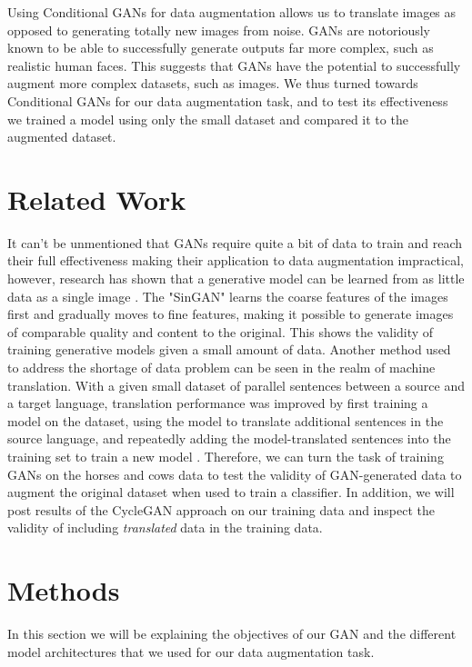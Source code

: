 \documentclass[conference]{IEEEtran}
\begin{document}
Using Conditional GANs for data augmentation allows us to translate images as opposed to generating totally new images from noise. GANs are notoriously known to be able to successfully generate outputs far more complex, such as realistic human faces. This suggests that GANs have the potential to successfully augment more complex datasets, such as images.
We thus turned towards Conditional GANs for our data augmentation task, and to test its effectiveness we trained a model using only the small dataset and compared it to the augmented dataset.

\section{Related Work}
It can't be unmentioned that GANs require quite a bit of data to train and reach their full effectiveness making their application to data augmentation impractical, however, research has shown that a generative model can be learned from as little data as a single image \cite{https://doi.org/10.48550/arxiv.1905.01164}. The "SinGAN" learns the coarse features of the images first and gradually moves to fine features, making it possible
to generate images of comparable quality and content to the original. This shows the validity of training generative
models given a small amount of data.
Another method used to address the shortage of data problem can be seen in the realm of machine translation. With a given small dataset of parallel sentences between a source and a target language, translation performance was improved by first training a model on the dataset, using the model to translate additional sentences in the source language, and repeatedly adding the model-translated sentences into the training set to train a new model \cite{https://doi.org/10.48550/arxiv.1909.13151}.
Therefore, we can turn the task of training GANs on the horses and cows data to test the validity of GAN-generated data to augment the original dataset when used to train a classifier. In addition, we will post results of the CycleGAN approach on our training data and inspect the validity of including \textit{translated} data in the training data.

\section{Methods}
In this section we will be explaining the objectives of our GAN and the different model architectures that we used for our data augmentation task.
\end{document}
